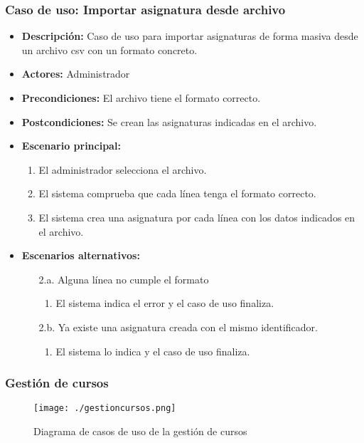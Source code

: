 \subsubsection*{Caso de uso: Importar asignatura desde archivo}
\begin{itemize}
\item{\bf Descripción:} Caso de uso para importar asignaturas de forma masiva desde un archivo csv con un formato concreto.
\item{\bf Actores:} Administrador
\item{\bf Precondiciones:} El archivo tiene el formato correcto.
\item{\bf Postcondiciones:} Se crean las asignaturas indicadas en el archivo.
\item{\bf Escenario principal:}
	\begin{enumerate}
	\item El administrador selecciona el archivo.
	\item El sistema comprueba que cada línea tenga el formato correcto.
	\item El sistema crea una asignatura por cada línea con los datos indicados en el archivo.
	\end{enumerate}
\item{\bf Escenarios alternativos:}
	\begin{itemize}
		\item[2.a.] Alguna línea no cumple el formato
		\begin{enumerate}
			\item El sistema indica el error y el caso de uso finaliza.
		\end{enumerate}
		\item[2.b.] Ya existe una asignatura creada con el mismo identificador.
		\begin{enumerate}
			\item El sistema lo indica y el caso de uso finaliza.
		\end{enumerate}
	\end{itemize}
\end{itemize}


\subsubsection{Gestión de cursos}
\begin{figure}[H] 
  \label{gestion-cursos} 
	\begin{center}
    \texttt{[image: ./gestioncursos.png]}
  \end{center}
\caption{Diagrama de casos de uso de la gestión de cursos}
\end{figure}

